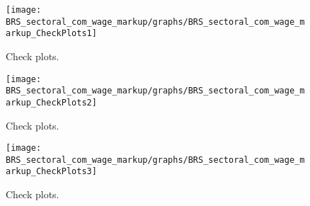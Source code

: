  
\begin{figure}[H]
\centering 
\texttt{[image: BRS\_sectoral\_com\_wage\_markup/graphs/BRS\_sectoral\_com\_wage\_markup\_CheckPlots1]}
\caption{Check plots.}\label{Fig:CheckPlots:1}
\end{figure}
 
\begin{figure}[H]
\centering 
\texttt{[image: BRS\_sectoral\_com\_wage\_markup/graphs/BRS\_sectoral\_com\_wage\_markup\_CheckPlots2]}
\caption{Check plots.}\label{Fig:CheckPlots:2}
\end{figure}
 
\begin{figure}[H]
\centering 
\texttt{[image: BRS\_sectoral\_com\_wage\_markup/graphs/BRS\_sectoral\_com\_wage\_markup\_CheckPlots3]}
\caption{Check plots.}\label{Fig:CheckPlots:3}
\end{figure}
 
